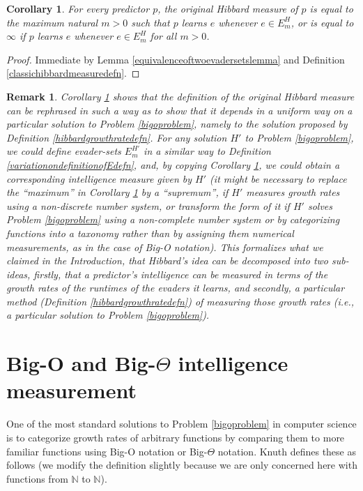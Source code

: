\documentclass{article}
\newtheorem{corollary}[theorem]{Corollary}
\newtheorem{remark}[theorem]{Remark}
\begin{document}
\begin{corollary}
\label{rephrasinghibbardsmeasurecorollary}
    For every predictor $p$, the original Hibbard measure of $p$
    is equal to the maximum natural $m>0$ such that
    $p$ learns $e$ whenever $e\in E^H_m$, or is equal to $\infty$
    if $p$ learns $e$ whenever $e\in E^H_m$ for all $m>0$.
\end{corollary}

\begin{proof}
    Immediate by Lemma \ref{equivalenceoftwoevadersetslemma}
    and Definition \ref{classichibbardmeasuredefn}.
\end{proof}

\begin{remark}
\label{epiphanyremark}
Corollary \ref{rephrasinghibbardsmeasurecorollary} shows that
the definition of the original Hibbard measure can be rephrased in such a way
as to show that it depends in a uniform way on a particular solution to
Problem \ref{bigoproblem}, namely to the solution proposed by
Definition \ref{hibbardgrowthratedefn}. For \emph{any} solution $H'$ to
Problem \ref{bigoproblem}, we could define evader-sets $E^{H'}_m$ in a similar
way to Definition \ref{variationondefinitionofEdefn}, and, by copying
Corollary \ref{rephrasinghibbardsmeasurecorollary}, we could obtain a corresponding
intelligence measure given by $H'$ (it might be necessary to replace the
``maximum'' in Corollary \ref{rephrasinghibbardsmeasurecorollary}
by a ``supremum'', if $H'$ measures growth rates using
a non-discrete number system, or transform the form of it if $H'$
solves Problem \ref{bigoproblem} using a non-complete number system or
by categorizing functions into a taxonomy
rather than by assigning
them numerical measurements, as in the case of Big-O notation). This
formalizes what we claimed in the Introduction,
that Hibbard's idea can be decomposed into two sub-ideas, firstly, that a predictor's
intelligence can be measured in terms of the growth rates of the runtimes of the
evaders it learns, and secondly, a particular method
(Definition \ref{hibbardgrowthratedefn})
of measuring those growth rates (i.e., a particular solution to
Problem \ref{bigoproblem}).
\end{remark}


\section{Big-O and Big-$\Theta$ intelligence measurement}
\label{bigosection}

One of the most standard solutions
to Problem \ref{bigoproblem} in computer science is to categorize
growth rates of arbitrary functions by comparing them to more familiar functions using
Big-O notation or Big-$\Theta$ notation.
Knuth defines \cite{knuth1976big} these as follows
(we modify the definition slightly because
we are only concerned here with functions from $\mathbb N$ to $\mathbb N$).
\end{document}
